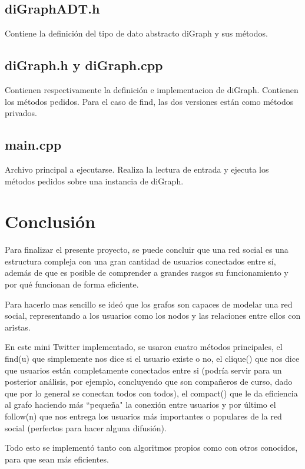 \documentclass[12pt]{article}
\begin{document}
\subsection{diGraphADT.h}
Contiene la definición del tipo de dato abstracto diGraph y sus métodos.
\subsection{diGraph.h y diGraph.cpp}
Contienen respectivamente la definición e implementacion de diGraph. Contienen los métodos pedidos. Para el caso de find, las dos versiones están como métodos privados.
\subsection{main.cpp}
Archivo principal a ejecutarse. Realiza la lectura de entrada y ejecuta los métodos pedidos sobre una instancia de diGraph.
\pagebreak

\section{Conclusión}
\indent \indent Para finalizar el presente proyecto, se puede concluir que una red social es una estructura compleja con una gran cantidad de usuarios conectados entre sí, además de que es posible de comprender a grandes rasgos su funcionamiento y por qué funcionan de forma eficiente.

Para hacerlo mas sencillo se ideó que los grafos son capaces de modelar una red social, representando a los usuarios como los nodos y las relaciones entre ellos con aristas.

En este mini Twitter implementado, se usaron cuatro métodos principales, el find(u) que simplemente nos dice si el usuario existe o no, el clique() que nos dice que usuarios están completamente conectados entre si (podría servir para un posterior análisis, por ejemplo, concluyendo que son compañeros de curso, dado que por lo general se conectan todos con todos), el compact() que le da eficiencia al grafo haciendo más ``pequeña" la conexión entre usuarios y por último el follow(n) que nos entrega los usuarios más importantes o populares de la red social (perfectos para hacer alguna difusión).

Todo esto se implementó tanto con algoritmos propios como con otros conocidos, para que sean más eficientes.
\end{document}
